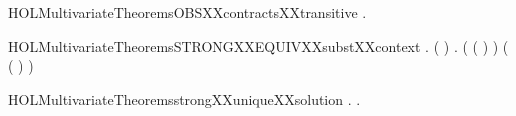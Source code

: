 \newcommand{\HOLMultivariateTheoremsOBSXXcontractsXXsubstXXcontext}{\UseVerbatim{HOLMultivariateTheoremsOBSXXcontractsXXsubstXXcontext}}
\begin{SaveVerbatim}{HOLMultivariateTheoremsOBSXXcontractsXXtransitive}
\HOLTokenTurnstile{} \HOLSymConst{\HOLTokenForall{}}  .
          \HOLSymConst{\HOLTokenConj{}}    \HOLSymConst{\HOLTokenImp{}}
         
\end{SaveVerbatim}
\newcommand{\HOLMultivariateTheoremsOBSXXcontractsXXtransitive}{\UseVerbatim{HOLMultivariateTheoremsOBSXXcontractsXXtransitive}}
\begin{SaveVerbatim}{HOLMultivariateTheoremsSTRONGXXEQUIVXXsubstXXcontext}
\HOLTokenTurnstile{} \HOLSymConst{\HOLTokenForall{}}  .
         \HOLSymConst{\HOLTokenConj{}} (  \HOLSymConst{=}  ) \HOLSymConst{\HOLTokenConj{}}
          \HOLSymConst{\HOLTokenImp{}}
       \HOLSymConst{\HOLTokenForall{}}.
              \HOLSymConst{\HOLTokenImp{}}
            ( ( \HOLSymConst{\HOLTokenMapto{}} ) )
             ( ( \HOLSymConst{\HOLTokenMapto{}} ) )
\end{SaveVerbatim}
\newcommand{\HOLMultivariateTheoremsSTRONGXXEQUIVXXsubstXXcontext}{\UseVerbatim{HOLMultivariateTheoremsSTRONGXXEQUIVXXsubstXXcontext}}
\begin{SaveVerbatim}{HOLMultivariateTheoremsstrongXXuniqueXXsolution}
\HOLTokenTurnstile{} \HOLSymConst{\HOLTokenForall{}} .
          \HOLSymConst{\HOLTokenConj{}}    \HOLSymConst{\HOLTokenImp{}}
       \HOLSymConst{\HOLTokenForall{}} .
            \HOLConst{\HOLTokenIn{}}     \HOLSymConst{\HOLTokenConj{}}
            \HOLConst{\HOLTokenIn{}}     \HOLSymConst{\HOLTokenImp{}}
             
\end{SaveVerbatim}
